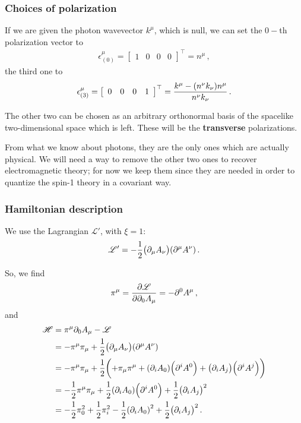 \documentclass[main.tex]{subfiles}
\begin{document}
\subsubsection{Choices of polarization}

If we are given the photon wavevector \(k^{\mu }\), which is null, we can set the \(0-\)th polarization vector to 
%
\begin{align}
\epsilon^{\mu }_{(0)} = \left[\begin{array}{cccc}
1 & 0 & 0 & 0
\end{array}\right]^{\top}
= n^{\mu }
\,,
\end{align}
%
the third one to 
%
\begin{align}
\epsilon^{\mu }_{(3)} = \left[\begin{array}{cccc}
0 & 0 & 0 & 1
\end{array}\right]^{\top}
= \frac{k^{\mu } - \qty(n^{\nu }k_{\nu })n^{\mu }}{n^{\nu }k_{\nu }}
\,.
\end{align}

The other two can be chosen as an arbitrary orthonormal basis of the spacelike two-dimensional space which is left.
These will be the \textbf{transverse} polarizations. 

From what we know about photons, they are the only ones which are actually physical. 
We will need a way to remove the other two ones to recover electromagnetic theory; for now we keep them since they are needed in order to quantize the spin-1 theory in a covariant way. 

\subsubsection{Hamiltonian description}

We use the Lagrangian \(\mathscr{L}'\), with \(\xi =1 \): 
%
\begin{align}
\mathscr{L}' = - \frac{1}{2} \qty(\partial_{\mu } A_{\nu })\qty(\partial^{\mu } A^{\nu } )
\,.
\end{align}

So, we find 
%
\begin{align}
\pi^{\mu } = \pdv{\mathscr{L}}{\partial_0 A_{\mu }}
= - \partial^{0} A^{\mu }
\,,
\end{align}
%
and 
%
\begin{align}
\mathscr{H} &= \pi^{\mu } \partial_0 A_{\mu }
- \mathscr{L}   \\
&= - \pi^{\mu } \pi_{\mu }
+ \frac{1}{2} \qty(\partial_{\mu } A_{\nu })\qty(\partial^{\mu } A^{\nu })  \\
&= - \pi^{\mu } \pi_{\mu } + \frac{1}{2} \qty(+ \pi_{\mu }\pi^{\mu } + \qty( \partial_{i } A_{0}) \qty(\partial^{i }A^{0})
+ \qty(\partial_{i} A_{j}) \qty(\partial^{i} A^{j}) )  \\
&= - \frac{1}{2} \pi^{\mu } \pi_{\mu }
+ \frac{1}{2}\qty(\partial_{i } A_{0})\qty(\partial^{i }A^{0})
+ \frac{1}{2} \qty(\partial_{i } A_{j})^2  \\
&=-\frac{1}{2} \pi_{0}^2
+ \frac{1}{2} \pi_{i}^2
- \frac{1}{2}\qty(\partial_{i} A_{0})^2
+ \frac{1}{2} \qty(\partial_{i } A_{j})^2 
\,.
\end{align}
\end{document}
